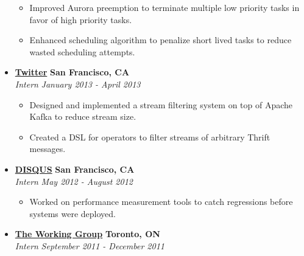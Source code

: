 \documentclass[10pt,letterpaper]{article}
\begin{document}
\begin{itemize}[leftmargin=*]
    \begin{itemize}[label=\textbullet]
      \itemsep0em
      \item Improved Aurora preemption to terminate multiple low priority tasks
      in favor of high priority tasks.
      \item Enhanced scheduling algorithm to penalize short lived tasks to
      reduce wasted scheduling attempts.
    \end{itemize}
    
    \item[]
    {\href{http://www.twitter.com}{\textbf{Twitter}} \hfill
      \textbf{San Francisco, CA}}
    \\
    {\emph{Intern} \hfill \emph{January 2013 - April 2013}}
    
    \begin{itemize}[label=\textbullet]
      \itemsep0em
      \item Designed and implemented a stream filtering system on top of Apache
      Kafka to reduce stream size.
      \item Created a DSL for operators to filter streams of arbitrary Thrift
      messages.
    \end{itemize}
    
    \item[]
    {\href{http://www.disqus.com}{\textbf{DISQUS}} \hfill
      \textbf{San Francisco, CA}}
    \\
    {\emph{Intern} \hfill \emph{May 2012 - August 2012}}
    
    \begin{itemize}[label=\textbullet]
      \itemsep0em
      \item Worked on performance measurement tools to catch regressions before
      systems were deployed.
    \end{itemize}
    
    
    \item[]
    {\href{http://www.twg.ca}{\textbf{The Working Group}} \hfill
      \textbf{Toronto, ON}}
    \\
    {\emph{Intern} \hfill \emph{September 2011 - December 2011}}
    

\end{itemize}
\end{document}
